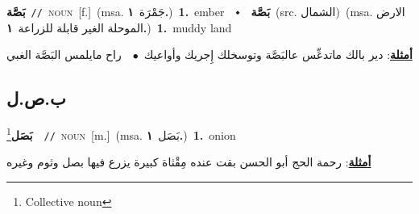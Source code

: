 \documentclass[10pt,a4paper,twoside]{article} %
\begin{document}
\begin{multicols}{2}
{\setlength\topsep{0pt}\textbf{\foreignlanguage{arabic}{بَصَّة}}\ {\color{gray}\texttt{//}\color{black}}\ \textsc{noun}\ [f.]\ \color{gray}(msa. \foreignlanguage{arabic}{جَمْرَة}~\foreignlanguage{arabic}{\textbf{١.}})\color{black}\ \textbf{1.}~ember\ \ $\smblkdiamond$\ \ \setlength\topsep{0pt}\textbf{\foreignlanguage{arabic}{بَصَّة}}\ (src. \color{gray}\foreignlanguage{arabic}{الشمال}\color{black})\ \color{gray}(msa. \foreignlanguage{arabic}{الارض الموحلة الغير قابلة للزراعة}~\foreignlanguage{arabic}{\textbf{١.}})\color{black}\ \textbf{1.}~muddy land\  \begin{flushright}\color{gray}\foreignlanguage{arabic}{\textbf{\underline{\foreignlanguage{arabic}{أمثلة}}}: دير بالك ماتدعِّس عالبَصَّة وتوسخلك إِجريك وأواعيك\ $\bullet$\ \  راح مايلمس البَصَّة الغبي}\end{flushright}\color{black}} \vspace{2mm}

\vspace{-3mm}
\subsection*{\color{blue}\foreignlanguage{arabic}{ب.ص.ل}\color{blue}{}} 

{\setlength\topsep{0pt}\textbf{\foreignlanguage{arabic}{بَصَل}}\footnote{Collective noun}\ \ {\color{gray}\texttt{//}\color{black}}\ \textsc{noun}\ [m.]\ \color{gray}(msa. \foreignlanguage{arabic}{بَصَل}~\foreignlanguage{arabic}{\textbf{١.}})\color{black}\ \textbf{1.}~onion\  \begin{flushright}\color{gray}\foreignlanguage{arabic}{\textbf{\underline{\foreignlanguage{arabic}{أمثلة}}}: رحمة الحج أبو الحسن بقت عنده مِقْثاة كبيرة يزرع فيها بصل وثوم وغيره}\end{flushright}\color{black}} \vspace{2mm}


\end{multicols}
\end{document}
